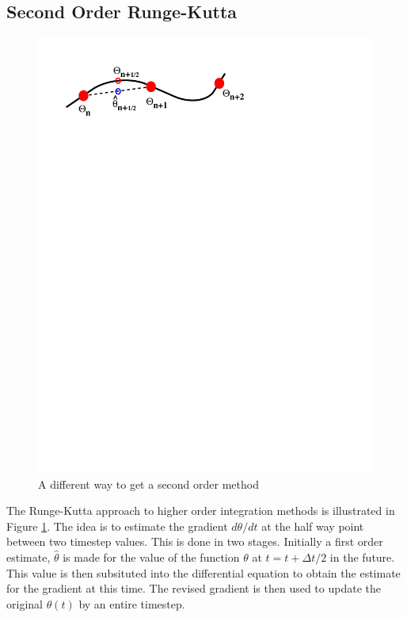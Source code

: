 \documentclass[10pt]{article}
\begin{document}
		\subsection{Second Order Runge-Kutta}
	
		\begin{figure}[h]           
			\begin{center}
	 			\includegraphics[width=0.66\linewidth]{Diagrams/theta_rk2.pdf}
	 			\caption[]{A different way to get a second order method}
	 			\label{fig:rk2}
	 		\end{center}
		\end{figure}
	
	The Runge-Kutta approach to higher order integration methods is
	illustrated in Figure \ref{fig:rk2}. The idea is to estimate the 
	gradient $d \theta / d t$ at the half way point between two
	timestep values.  This is done in two stages. Initially a 
	first order estimate, $\hat{\theta}$ is made for the value of the function
	$\theta$ at $t=t+\Delta t /2$ in the future. This value is then
	subsituted into the differential equation to obtain the
	estimate for the gradient at this time. The revised gradient is
	then used to update the original $\theta(t)$ by an entire timestep.
	
\end{document}
